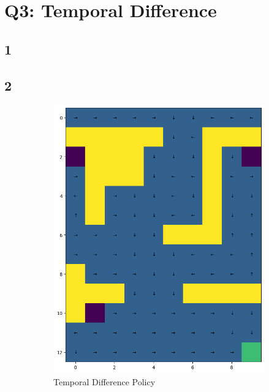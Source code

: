 \section*{Q3: Temporal Difference}
\subsection*{1}


\subsection*{2}

\begin{figure}[H]
    \centering
    \begin{subfigure}[b]{0.4\textwidth}
        \centering
        \includegraphics[width=\textwidth]{assets/td/td_policy.png}        
        \caption{Temporal Difference Policy}
    \end{subfigure}
    \hfill 
    \begin{subfigure}[b]{0.4\textwidth}

\end{subfigure}
\end{figure}
